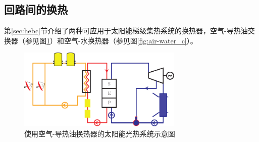 \subsection{回路间的换热}

第\ref{sec:hebc}节介绍了两种可应用于太阳能梯级集热系统的换热器，空气-导热油交换器（参见图\ref{fig:air-oil_c}）和空气-水换热器（参见图\ref{fig:air-water_c}）。

\begin{figure}[ht]
\centering 
\includegraphics[width=0.7\textwidth]{fig/air-oil}
\caption{使用空气-导热油换热器的太阳能光热系统示意图}\label{fig:air-oil_c}
\end{figure}

